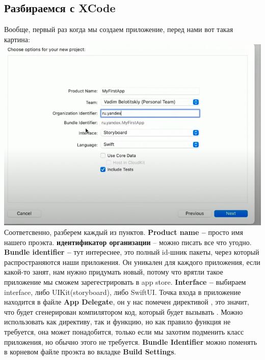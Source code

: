\documentclass{article}
\begin{document}
    \subsection{Разбираемся с XCode}
    Вообще, первый раз когда мы создаем приложение, перед нами вот такая картина:
    \newline
    \includegraphics[scale = 0.5]{pic/xcodeOpen.png}
    \newline
    Соответсвенно, разберем каждый из пунктов. 
    \newline
    \textbf{Product name --} просто имя нашего проэкта. \textbf{идентификатор организации} -- можно писать все что угодно. \textbf{Bundle identifier -- } тут интереснее, это полный id-шник пакеты, через который распространяются наши приложения. Он уникален для каждого приложения, если какой-то занят, нам нужно придумать новый, потому что врятли такое приложение мы сможем зарегестрировать в app store.
    \newline
    \textbf{Interface --} выбираем interface, либо UIKit(storyboard), либо SwiftUI.
    \newline
    Точка входа в приложение находится в файле \textbf{App Delegate}, он у нас помечен директивой , это значит, что будет сгенерирован компилятором код, который будет вызывать . Можно использовать как директиву, так и функцию, но как правило функция не требуется, она может понадобится, только если мы захотим подменить класс приложения, но обычно этого не требуется. 
    \newline
    \textbf{Bundle Identifier } можно поменять в корневом файле проэкта во вкладке \textbf{Build Settings}.
    \newline
\end{document}
